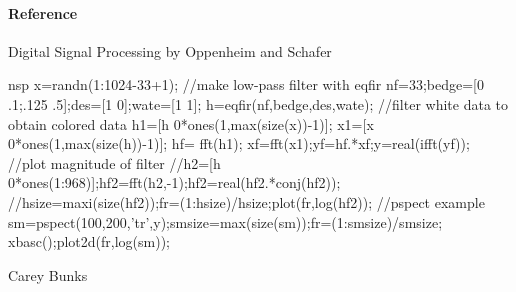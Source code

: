 \paragraph{Reference}
Digital Signal Processing by Oppenheim and Schafer
\begin{examples}
  \begin{mintednsp}{nsp}
    x=randn(1:1024-33+1);
    //make low-pass filter with eqfir
    nf=33;bedge=[0 .1;.125 .5];des=[1 0];wate=[1 1];
    h=eqfir(nf,bedge,des,wate);
    //filter white data to obtain colored data 
    h1=[h 0*ones(1,max(size(x))-1)];
    x1=[x 0*ones(1,max(size(h))-1)];
    hf= fft(h1);   xf=fft(x1);yf=hf.*xf;y=real(ifft(yf));
    //plot magnitude of filter
    //h2=[h 0*ones(1:968)];hf2=fft(h2,-1);hf2=real(hf2.*conj(hf2));
    //hsize=maxi(size(hf2));fr=(1:hsize)/hsize;plot(fr,log(hf2));
    //pspect example
    sm=pspect(100,200,'tr',y);smsize=max(size(sm));fr=(1:smsize)/smsize;
    xbasc();plot2d(fr,log(sm));
  \end{mintednsp}
\end{examples}
\begin{manseealso}
\end{manseealso}
\begin{authors}
  Carey Bunks
\end{authors}
